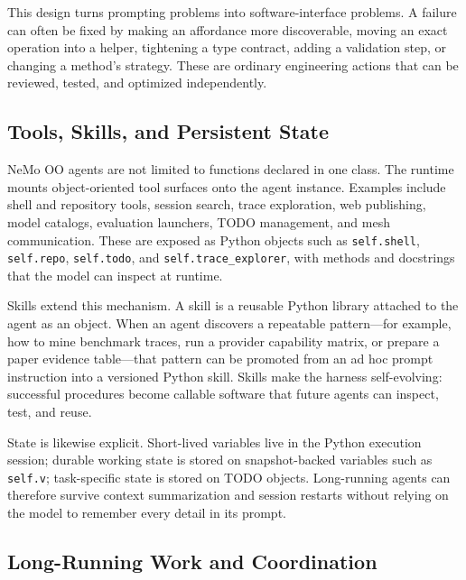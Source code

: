 \documentclass[11pt, logo, onecolumn, copyright, colorlinks=true, allcolors=blue]{nvidiatechreport}
\begin{document}
This design turns prompting problems into software-interface problems.  A
failure can often be fixed by making an affordance more discoverable, moving an
exact operation into a helper, tightening a type contract, adding a validation
step, or changing a method's strategy.  These are ordinary engineering actions
that can be reviewed, tested, and optimized independently.

\subsection{Tools, Skills, and Persistent State}
\label{sec:harness:tools}

NeMo OO agents are not limited to functions declared in one class.  The runtime
mounts object-oriented tool surfaces onto the agent instance.  Examples include
shell and repository tools, session search, trace exploration, web publishing,
model catalogs, evaluation launchers, TODO management, and mesh communication.
These are exposed as Python objects such as \texttt{self.shell},
\texttt{self.repo}, \texttt{self.todo}, and \texttt{self.trace\_explorer}, with
methods and docstrings that the model can inspect at runtime.

Skills extend this mechanism.  A skill is a reusable Python library attached to
the agent as an object.  When an agent discovers a repeatable pattern---for
example, how to mine benchmark traces, run a provider capability matrix, or
prepare a paper evidence table---that pattern can be promoted from an ad hoc
prompt instruction into a versioned Python skill.  Skills make the harness
self-evolving: successful procedures become callable software that future agents
can inspect, test, and reuse.

State is likewise explicit.  Short-lived variables live in the Python execution
session; durable working state is stored on snapshot-backed variables such as
\texttt{self.v}; task-specific state is stored on TODO objects.  Long-running
agents can therefore survive context summarization and session restarts without
relying on the model to remember every detail in its prompt.

\subsection{Long-Running Work and Coordination}
\label{sec:harness:coordination}
\end{document}
